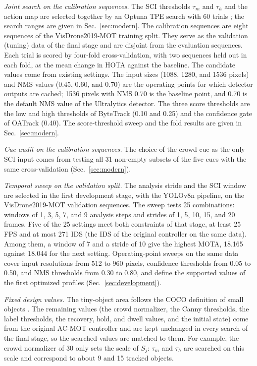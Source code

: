 \documentclass[journal]{new-aiaa}
\begin{document}
\emph{Joint search on the calibration sequences.} The SCI thresholds $\tau_m$
and $\tau_h$ and the action map are selected together by an Optuna TPE search
with 60 trials \cite{akiba2019optuna}; the search ranges are given in
Sec.~\ref{sec:modern}. The calibration sequences are eight
sequences of the VisDrone2019-MOT training split. They serve as the validation
(tuning) data of the final stage and are disjoint from the evaluation
sequences. Each trial is scored by four-fold cross-validation, with two
sequences held out in each fold, as the mean change in HOTA against the
baseline. The candidate values come from existing settings. The input sizes
(1088, 1280, and 1536 pixels) and NMS values (0.45, 0.60, and 0.70) are the
operating points for which detector outputs are cached; 1536 pixels
with NMS 0.70 is the baseline point, and 0.70 is the default NMS value of the
Ultralytics detector. The three score thresholds are the low and high
thresholds of ByteTrack (0.10 and 0.25) and the confidence gate of OATrack
(0.40). The score-threshold sweep and the fold results are given in
Sec.~\ref{sec:modern}.

\emph{Cue audit on the calibration sequences.} The choice of the crowd cue as
the only SCI input comes from testing all 31 non-empty subsets of the five
cues with the same cross-validation (Sec.~\ref{sec:modern}).

\emph{Temporal sweep on the validation split.} The analysis stride and the
SCI window are selected in the first development stage, with the YOLOv8n
pipeline, on the VisDrone2019-MOT validation sequences. The sweep tests 25
combinations: windows of 1, 3, 5, 7, and 9 analysis steps and strides of 1, 5,
10, 15, and 20 frames. Five of the 25 settings meet both constraints of that
stage, at least 25 FPS and at most 271 IDS (the IDS of the original controller
on the same data). Among them, a window of 7 and a stride of 10 give the
highest MOTA, 18.165 against 18.044 for the next setting. Operating-point
sweeps on the same data cover input resolutions from 512 to 960 pixels,
confidence thresholds from 0.05 to 0.50, and NMS thresholds from 0.30 to 0.80,
and define the supported values of the first optimized profiles
(Sec.~\ref{sec:development}).

\emph{Fixed design values.} The tiny-object area follows the COCO definition
of small objects \cite{lin2014coco}. The remaining values (the crowd
normalizer, the Canny thresholds, the label thresholds, the recovery, hold,
and dwell values, and the initial state) come from the original AC-MOT
controller and are kept unchanged in every search of the final stage, so the
searched values are matched to them. For example, the crowd normalizer of 30 only sets the
scale of $S_j$: $\tau_m$ and $\tau_h$ are searched on this scale and
correspond to about 9 and 15 tracked objects.
\end{document}
